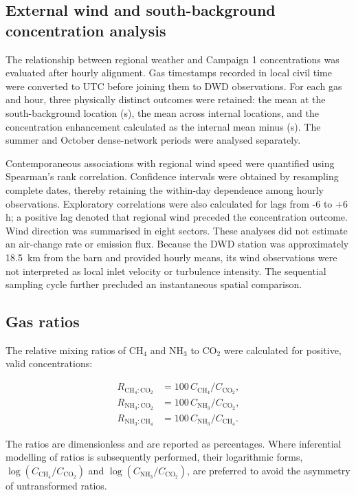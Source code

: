 \documentclass[12pt,a4paper]{article}
\begin{document}
\subsection{External wind and south-background concentration analysis}

The relationship between regional weather and Campaign 1 concentrations was
evaluated after hourly alignment. Gas timestamps recorded in local civil time
were converted to UTC before joining them to DWD observations. For each gas
and hour, three physically distinct outcomes were retained: the mean at the
south-background location (s), the mean across internal locations, and the
concentration enhancement calculated as the internal mean minus (s). The
summer and October dense-network periods were analysed separately.

Contemporaneous associations with regional wind speed were quantified using
Spearman's rank correlation. Confidence intervals were obtained by resampling
complete dates, thereby retaining the within-day dependence among hourly
observations. Exploratory correlations were also calculated for lags from
-6 to +6 h; a positive lag denoted that regional wind preceded the
concentration outcome. Wind direction was summarised in eight sectors. These
analyses did not estimate an air-change rate or emission flux. Because the DWD
station was approximately \SI{18.5}{km} from the barn and provided hourly
means, its wind observations were not interpreted as local inlet velocity or
turbulence intensity. The sequential sampling cycle further precluded an
instantaneous spatial comparison.

\subsection{Gas ratios}

The relative mixing ratios of \(\mathrm{CH_4}\) and \(\mathrm{NH_3}\) to
\(\mathrm{CO_2}\) were calculated for positive, valid concentrations:

\begin{align}
R_{\mathrm{CH_4:CO_2}} &=
100\,C_{\mathrm{CH_4}}/C_{\mathrm{CO_2}},\\
R_{\mathrm{NH_3:CO_2}} &=
100\,C_{\mathrm{NH_3}}/C_{\mathrm{CO_2}},\\
R_{\mathrm{NH_3:CH_4}} &=
100\,C_{\mathrm{NH_3}}/C_{\mathrm{CH_4}}.
\end{align}

The ratios are dimensionless and are reported as percentages. Where
inferential modelling of ratios is subsequently performed, their logarithmic
forms, \(\log(C_{\mathrm{CH_4}}/C_{\mathrm{CO_2}})\) and
\(\log(C_{\mathrm{NH_3}}/C_{\mathrm{CO_2}})\), are preferred to avoid the
asymmetry of untransformed ratios.
\end{document}
